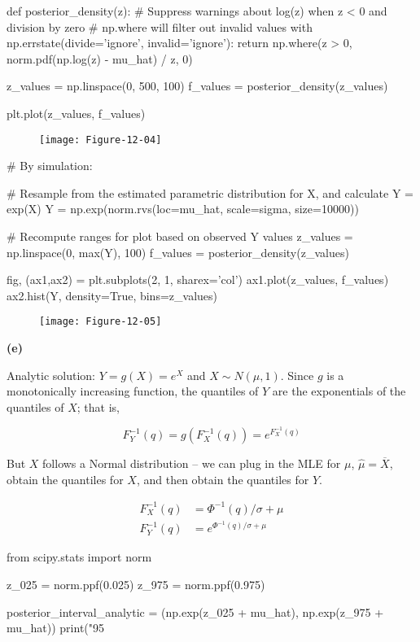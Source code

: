 \begin{python}
def posterior_density(z):
    # Suppress warnings about log(z) when z < 0 and division by zero 
    # np.where will filter out invalid values
    with np.errstate(divide='ignore', invalid='ignore'):
        return np.where(z > 0, norm.pdf(np.log(z) - mu_hat) / z, 0)
    
z_values = np.linspace(0, 500, 100)
f_values = posterior_density(z_values)

plt.plot(z_values, f_values)
\end{python}

\begin{figure}[H]
\centering
\texttt{[image: Figure-12-04]}
\end{figure}

\begin{python}
# By simulation:

# Resample from the estimated parametric distribution for X, and calculate Y = exp(X)
Y = np.exp(norm.rvs(loc=mu_hat, scale=sigma, size=10000))

# Recompute ranges for plot based on observed Y values
z_values = np.linspace(0, max(Y), 100)
f_values = posterior_density(z_values)

fig, (ax1,ax2) = plt.subplots(2, 1, sharex='col')
ax1.plot(z_values, f_values)
ax2.hist(Y, density=True, bins=z_values)
\end{python}

\begin{figure}[H]
\centering
\texttt{[image: Figure-12-05]}
\end{figure}

\textbf{(e)}

Analytic solution: \(Y = g(X) = e^X\) and \(X \sim N(\mu, 1)\). Since
\(g\) is a monotonically increasing function, the quantiles of \(Y\) are
the exponentials of the quantiles of \(X\); that is,

\[F_Y^{-1}(q) = g(F_X^{-1}(q)) = e^{F_X^{-1}(q)}\]

But \(X\) follows a Normal distribution -- we can plug in the MLE for
\(\mu\), \(\hat{\mu} = \overline{X}\), obtain the quantiles for \(X\),
and then obtain the quantiles for \(Y\).

\begin{align*}
F_X^{-1}(q) &= \Phi^{-1}(q) / \sigma + \mu \\
F_Y^{-1}(q) &= e^{\Phi^{-1}(q) / \sigma + \mu}
\end{align*}

\begin{python}
from scipy.stats import norm

z_{0}25 = norm.ppf(0.025)
z_975 = norm.ppf(0.975)

posterior_{i}nterval_analytic = (np.exp(z_{0}25 + mu_hat), np.exp(z_975 + mu_hat))
print("95%
\end{python}


